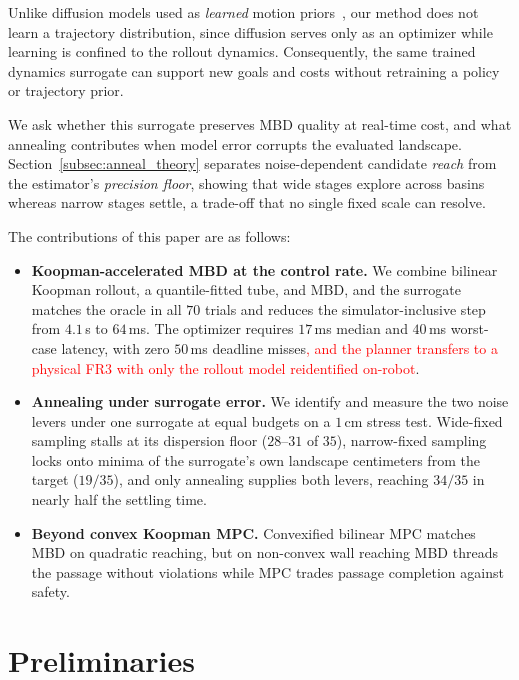 \documentclass[letterpaper,10pt,conference]{ieeeconf}
\newcommand{\nd}[1]{\textcolor{red}{#1}}
\begin{document}
Unlike diffusion models used as \emph{learned} motion priors~\cite{janner2022planning, chi2025diffusion, carvalho2023motion}, our method does not learn a trajectory distribution, since diffusion serves only as an optimizer while learning is confined to the rollout dynamics.
Consequently, the same trained dynamics surrogate can support new goals and costs without retraining a policy or trajectory prior.

We ask whether this surrogate preserves MBD quality at real-time cost, and what annealing contributes when model error corrupts the evaluated landscape.
Section~\ref{subsec:anneal_theory} separates noise-dependent candidate \emph{reach} from the estimator's \emph{precision floor}, showing that wide stages explore across basins whereas narrow stages settle, a trade-off that no single fixed scale can resolve.

The contributions of this paper are as follows:
\begin{itemize}
\item \textbf{Koopman-accelerated MBD at the control rate.}
We combine bilinear Koopman rollout, a quantile-fitted tube, and MBD, and the surrogate matches the oracle in all $70$ trials and reduces the simulator-inclusive step from $4.1$\,s to $64$\,ms. The optimizer requires $17$\,ms median and $40$\,ms worst-case latency, with zero $50$\,ms deadline misses\nd{, and the planner transfers to a physical FR3 with only the rollout model reidentified on-robot}.
\item \textbf{Annealing under surrogate error.}
We identify and measure the two noise levers under one surrogate at equal budgets on a $1$\,cm stress test. Wide-fixed sampling stalls at its dispersion floor ($28$--$31$ of $35$), narrow-fixed sampling locks onto minima of the surrogate's own landscape centimeters from the target ($19/35$), and only annealing supplies both levers, reaching $34/35$ in nearly half the settling time.
\item \textbf{Beyond convex Koopman MPC.}
Convexified bilinear MPC matches MBD on quadratic reaching, but on non-convex wall reaching MBD threads the passage without violations while MPC trades passage completion against safety.
\end{itemize}

\section{Preliminaries}\label{sec:prelim}
\end{document}
